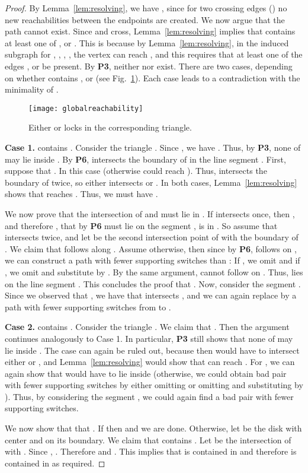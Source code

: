 \documentclass[11pt,a4paper]{paper}
\begin{document}
\begin{proof}
By Lemma~\ref{lem:resolving}, we have ,
since for two crossing edges () no new 
reachabilities between the endpoints are created.
We now argue that the path  cannot exist.
Since  and  cross,
Lemma~\ref{lem:resolving} implies that  contains at least one
of
,
or . This is because by Lemma~\ref{lem:resolving}, in the 
induced subgraph for , , , , the vertex 
 can reach , and this requires that at least one of the edges
, or  be present.
By \textbf{P3}, neither
 nor 
exist.
There are two cases, depending on whether  contains
, or 
(see Fig.~\ref{fig:globalreachability}).
Each case  leads to a contradiction with the minimality of .
\begin{figure}[htb]
\centering
\texttt{[image: globalreachability]}
\caption{Either  or  locks  in
the corresponding triangle.}
\label{fig:globalreachability}
\end{figure}

\textbf{Case 1.}  contains .
Consider the triangle .
Since , we have
.
Thus, by \textbf{P3}, none of 
may lie inside .
By \textbf{P6}, 
intersects the boundary of  in the line segment
.
First, suppose that . In this case
 (otherwise  could reach ).
Thus,  intersects the boundary of 
twice, so  either intersects
  or .
In both cases, Lemma~\ref{lem:resolving} shows that  reaches
. Thus, we must have .

We now prove that the intersection  of
 and  must
lie in .
If
  intersects 
once, then ,
and therefore , that by \textbf{P6} must lie on the segment
, is in . So assume that
 intersects
 twice, and let  be the second intersection
point of  with the boundary of . We claim that  follows 
along . Assume otherwise, then since by \textbf{P6},   follows
  on ,
we can construct a path with fewer supporting switches than :
If , we omit
 and
if ,
we omit 
and substitute  by .
By the same argument,  cannot follow  on
.
Thus,  lies on
the line segment .
This concludes the proof that
 .
Now, consider the segment . Since we observed that
, we have that 
intersects , and we can again replace  by a path with fewer supporting 
switches from  to .

\textbf{Case 2.}  contains .
Consider the triangle
. We claim
that .
Then the  argument continues analogously  to
Case 1. In particular, 
\textbf{P3} still shows that none of 
may lie inside . The case  
can again be ruled out, because then  would have to
intersect either  or , and 
Lemma~\ref{lem:resolving} would show that  can reach .
For , we can again show that 
 would have to lie inside  (otherwise,
we could obtain bad pair with fewer supporting switches
by either omitting  or omitting  and 
substituting  by ). Thus, by considering
the segment , we could again find 
a bad pair with fewer supporting switches.

We now show that
that .
If  then  and we are done.
Otherwise,
let  be the disk with center  and 
on its boundary. We claim that  contains .
Let  be the intersection of  with .
Since , . Therefore
 and
.
This implies that  is contained in  and therefore
 is contained in  as required.
\end{proof}
\end{document}
